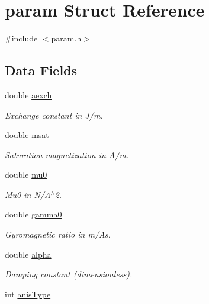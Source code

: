 \hypertarget{structparam}{
\section{param Struct Reference}
\label{structparam}
}


{\ttfamily \#include $<$param.h$>$}

\subsection*{Data Fields}
\begin{DoxyCompactItemize}
\item 
double \hyperlink{structparam_aa76816b3e378b7c178bcd415bf0aaa45}{aexch}
\begin{DoxyCompactList}\small\item\em Exchange constant in J/m. \item\end{DoxyCompactList}\item 
double \hyperlink{structparam_a33823ce6bf70294552c9ba010968c763}{msat}
\begin{DoxyCompactList}\small\item\em Saturation magnetization in A/m. \item\end{DoxyCompactList}\item 
double \hyperlink{structparam_a601e8c74ba2d2491928544f4a23e76c5}{mu0}
\begin{DoxyCompactList}\small\item\em Mu0 in N/A$^\wedge$2. \item\end{DoxyCompactList}\item 
double \hyperlink{structparam_ab864c16cb577a5f26214b21dda24ffc7}{gamma0}
\begin{DoxyCompactList}\small\item\em Gyromagnetic ratio in m/As. \item\end{DoxyCompactList}\item 
double \hyperlink{structparam_af4838a61f63120c740e89f8eed3e4081}{alpha}
\begin{DoxyCompactList}\small\item\em Damping constant (dimensionless). \item\end{DoxyCompactList}\item 
int \hyperlink{structparam_a406d002048cd0590e61d33bc2f02744a}{anisType}

\end{DoxyCompactItemize}

